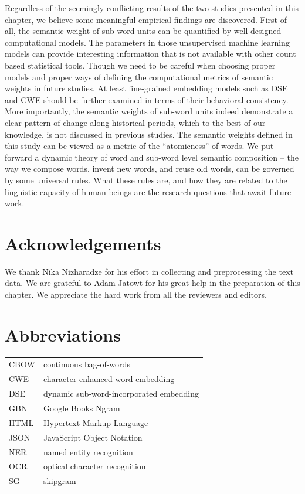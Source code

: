 \documentclass[output=paper]{langsci/langscibook}
\begin{document}
Regardless of the seemingly conflicting results of the two studies presented in this chapter, we believe some meaningful empirical findings are discovered. First of all, the semantic weight of sub-word units can be quantified by well designed computational models. The parameters in those unsupervised machine learning models can provide interesting information that is not available with other count based statistical tools. 
Though we need to be careful when choosing proper models and proper ways of defining the computational metrics of semantic weights in future studies. At least fine-grained embedding models such as DSE and CWE should be further examined in terms of their behavioral consistency. 
More importantly, the semantic weights of sub-word units indeed demonstrate a clear pattern of change along historical periods, which to the best of our knowledge, is not discussed in previous studies. The semantic weights defined in this study can be viewed as a metric of the ``atomicness'' of words. We put forward a dynamic theory of word and sub-word level semantic composition -- the way we compose words, invent new words, and reuse old words, can be governed by some universal rules. What these rules are, and how they are related to the linguistic capacity of human beings are the research questions that await future work.


\section*{Acknowledgements}
We thank Nika Nizharadze for his effort in collecting and preprocessing the text data. We are grateful to Adam Jatowt for his great help in the preparation of this chapter. We appreciate the hard work from all the reviewers and editors. 

\section*{Abbreviations}
\begin{tabularx}{\textwidth}{@{}lQ@{}}
CBOW & continuous bag-of-words\\
CWE & character-enhanced word embedding\\
DSE & dynamic sub-word-incorporated embedding\\
GBN & Google Books Ngram\\
HTML & Hypertext Markup Language\\
JSON & JavaScript Object Notation\\
NER & named entity recognition\\
OCR & optical character recognition\\
SG & skipgram\\
\end{tabularx}


{\sloppy\printbibliography[heading=subbibliography,notkeyword=this]}
\end{document}
